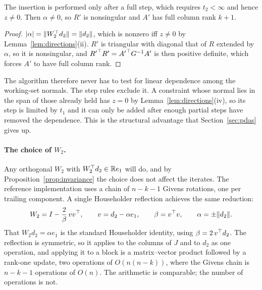\begin{proposition}\label{prop:rank}
The insertion is performed only after a full step, which requires $t_2 < \infty$
and hence $z \neq 0$. Then $\alpha \neq 0$, so $R'$ is nonsingular and $A'$ has
full column rank $k+1$.
\end{proposition}

\begin{proof}
$|\alpha| = \lVert W_2^{\top} d_2 \rVert = \lVert d_2 \rVert$, which is nonzero iff $z \neq 0$ by
Lemma~\ref{lem:directions}(ii). $R'$ is triangular with diagonal that of $R$
extended by $\alpha$, so it is nonsingular, and ${R'}^{\top} R' = {A'}^{\top} G^{-1}A'$ is then
positive definite, which forces $A'$ to have full column rank.
\end{proof}

The algorithm therefore never has to test for linear dependence among the
working-set normals. The step rules exclude it. A
constraint whose normal lies in the span of those already held has $z = 0$ by
Lemma~\ref{lem:directions}(iv), so its step is limited by $t_1$ and it can only
be added after enough partial steps have removed the dependence. This is the
structural advantage that Section~\ref{sec:pdas} gives up.

\paragraph{The choice of $W_2$.} Any orthogonal $W_2$ with
$W_2^{\top} d_2 \in \mathbb{R} e_1$ will do, and by Proposition~\ref{prop:invariance} the
choice does not affect the iterates. The reference implementation uses a chain of
$n-k-1$ Givens rotations, one per trailing component. A single Householder
reflection achieves the same reduction:
\begin{equation}
  W_2 = I - \frac{2}{\beta}\, v v^{\top},
  \qquad v = d_2 - \alpha e_1,
  \qquad \beta = v^{\top} v,
  \qquad \alpha = \pm\lVert d_2 \rVert.
  \label{eq:householder}
\end{equation}
That $W_2 d_2 = \alpha e_1$ is the standard Householder identity, using
$\beta = 2\,v^{\top} d_2$. The reflection is symmetric, so it applies to the columns of
$J$ and to $d_2$ as one operation, and applying it to a block is a
matrix--vector product followed by a rank-one update, two operations of
$O(n(n-k))$, where the Givens chain is $n-k-1$ operations of $O(n)$. The
arithmetic is comparable; the number of operations is not.

